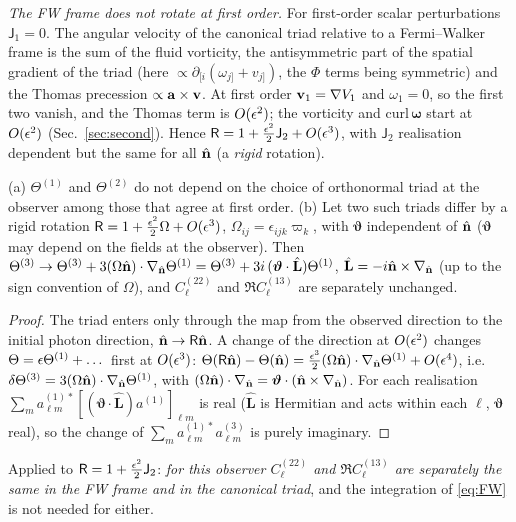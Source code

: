 \emph{The FW frame does not rotate at first order.}  For first-order scalar perturbations $\mathsf J_1=0$.  The angular velocity of the canonical
triad relative to a Fermi--Walker frame is the sum of the fluid vorticity, the antisymmetric part of the spatial gradient of the triad
(here $\propto\partial_{[i}(\omega_{j]}+v_{j]})$, the $\Phi$ terms being symmetric) and the Thomas precession $\propto\mathbf a\times\mathbf v$.  At first
order $\mathbf v_1=\nabla V_1$ and $\omega_1=0$, so the first two vanish, and the Thomas term is $O(\epsilon^2)$; the vorticity and $\mathrm{curl}\,\boldsymbol\omega$
start at $O(\epsilon^2)$ (Sec.~\ref{sec:second}).  Hence $\mathsf R=1+\tfrac{\epsilon^2}2\mathsf J_2+O(\epsilon^3)$, with $\mathsf J_2$ realisation dependent but the same
for all $\hat{\mathbf n}$ (a \emph{rigid} rotation).

\begin{lemma}\label{lem:asm-triad}
(a) $\Theta^{(1)}$ and $\Theta^{(2)}$ do not depend on the choice of orthonormal triad at the observer among those that agree at first order.
(b) Let two such triads differ by a rigid rotation $\mathsf R=1+\tfrac{\epsilon^2}2\Omega+O(\epsilon^3)$, $\Omega_{ij}=\epsilon_{ijk}\varpi_k$, with $\boldsymbol\vartheta$
independent of $\hat{\mathbf n}$ ($\boldsymbol\vartheta$ may depend on the fields at the observer).  Then
$\Theta^{(3)}\to\Theta^{(3)}+3(\Omega\hat{\mathbf n})\cdot\nabla_{\hat{\mathbf n}}\Theta^{(1)}=\Theta^{(3)}+3i\,(\boldsymbol\vartheta\cdot\hat{\mathbf L})\Theta^{(1)}$, $\hat{\mathbf L}=-i\hat{\mathbf n}\times\nabla_{\hat{\mathbf n}}$
(up to the sign convention of $\Omega$), and $C^{(22)}_\ell$ and $\Re C^{(13)}_\ell$ are separately unchanged.
\end{lemma}
\begin{proof}
The triad enters only through the map from the observed direction to the initial photon direction, $\hat{\mathbf n}\to\mathsf R\hat{\mathbf n}$.  A change of the
direction at $O(\epsilon^2)$ changes $\Theta=\epsilon\Theta^{(1)}+\dots$ first at $O(\epsilon^3)$: $\Theta(\mathsf R\hat{\mathbf n})-\Theta(\hat{\mathbf n})=\tfrac{\epsilon^3}2(\Omega\hat{\mathbf n})\cdot\nabla_{\hat{\mathbf n}}\Theta^{(1)}+O(\epsilon^4)$,
i.e.\ $\delta\Theta^{(3)}=3(\Omega\hat{\mathbf n})\cdot\nabla_{\hat{\mathbf n}}\Theta^{(1)}$, with $(\Omega\hat{\mathbf n})\cdot\nabla_{\hat{\mathbf n}}=\boldsymbol\vartheta\cdot(\hat{\mathbf n}\times\nabla_{\hat{\mathbf n}})$.  For each realisation
$\sum_ma^{(1)*}_{\ell m}[(\boldsymbol\vartheta\cdot\hat{\mathbf L})a^{(1)}]_{\ell m}$ is real ($\hat{\mathbf L}$ is Hermitian and acts within each $\ell$, $\boldsymbol\vartheta$ real), so the change of
$\sum_ma^{(1)*}_{\ell m}a^{(3)}_{\ell m}$ is purely imaginary.
\end{proof}
\noindent Applied to $\mathsf R=1+\tfrac{\epsilon^2}2\mathsf J_2$: \emph{for this observer $C^{(22)}_\ell$ and $\Re C^{(13)}_\ell$ are separately the same in the FW
frame and in the canonical triad}, and the integration of \eqref{eq:FW} is not needed for either.

